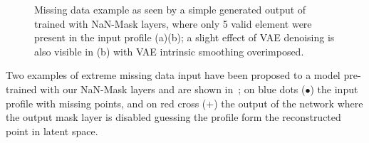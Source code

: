 \begin{figure}
    \centering
    \caption{Missing data example as seen by a simple generated output of  trained with NaN-Mask layers, where only 5 valid element were present in the input profile (a)(b); a slight effect of VAE denoising is also visible in (b) with VAE intrinsic smoothing overimposed. }
    \label{fig:missing data example}
\end{figure}
Two examples of extreme missing data input have been proposed to a  model pre-trained with our NaN-Mask layers and are shown in~\Figure{\ref{fig:missing data example}}; on blue dots ($\bullet$) the input profile with missing points, and on red cross (+) the output of the network where the output mask layer is disabled guessing the profile form the reconstructed point in latent space.



